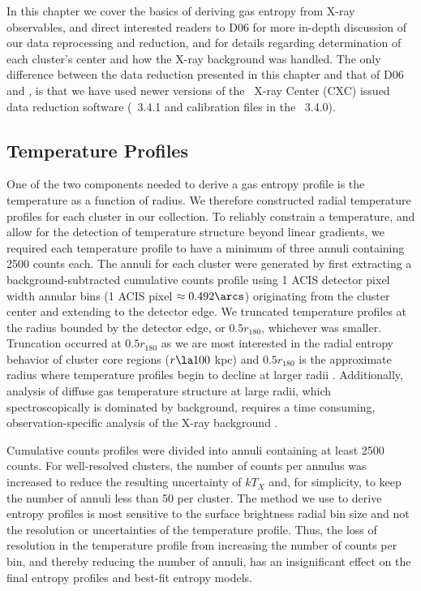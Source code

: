 In this chapter we cover the basics of deriving gas entropy from X-ray
observables, and direct interested readers to D06 for more in-depth
discussion of our data reprocessing and reduction, and
\citet{xrayband} for details regarding determination of each cluster's
center and how the X-ray background was handled. The only difference
between the data reduction presented in this chapter and that of D06 and
\citet{xrayband}, is that we have used newer versions of the \chandra\
X-ray Center (CXC) issued data reduction software (\ciao\ 3.4.1 and
calibration files in the \caldb\ 3.4.0).

\subsection{Temperature Profiles}
\label{sec:entsupptemppr}

One of the two components needed to derive a gas entropy profile is
the temperature as a function of radius. We therefore constructed
radial temperature profiles for each cluster in our collection. To
reliably constrain a temperature, and allow for the detection of
temperature structure beyond linear gradients, we required each
temperature profile to have a minimum of three annuli containing 2500
counts each. The annuli for each cluster were generated by first
extracting a background-subtracted cumulative counts profile using 1
ACIS detector pixel width annular bins (1 ACIS pixel $\approx
0.492\arcs$) originating from the cluster center and extending to the
detector edge. We truncated temperature profiles at the radius bounded
by the detector edge, or $0.5 r_{180}$, whichever was
smaller. Truncation occurred at $0.5 r_{180}$ as we are most
interested in the radial entropy behavior of cluster core regions ($r
\la 100$ kpc) and $0.5 r_{180}$ is the approximate radius where
temperature profiles begin to decline at larger radii
\citep{2005ApJ...628..655V}.  Additionally, analysis of diffuse gas
temperature structure at large radii, which spectroscopically is
dominated by background, requires a time consuming,
observation-specific analysis of the X-ray background \cite[see][for a
  detailed discussion on this point]{minggroups}.

Cumulative counts profiles were divided into annuli containing at
least 2500 counts. For well-resolved clusters, the number of counts
per annulus was increased to reduce the resulting uncertainty of
$kT_X$ and, for simplicity, to keep the number of annuli less than 50
per cluster. The method we use to derive entropy profiles is most
sensitive to the surface brightness radial bin size and not the
resolution or uncertainties of the temperature profile. Thus, the loss
of resolution in the temperature profile from increasing the number of
counts per bin, and thereby reducing the number of annuli, has an
insignificant effect on the final entropy profiles and best-fit
entropy models.

